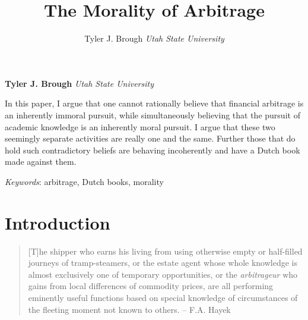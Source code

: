 \documentclass[11pt,]{article}
\title{The Morality of Arbitrage  }
\author{\Large Tyler J. Brough\vspace{0.05in} \newline\normalsize\emph{Utah State University}  }
\date{}
\newcommand*{\authorfont}{\fontfamily{phv}\selectfont}
\renewenvironment{abstract}
 {{%
    \setlength{\leftmargin}{0mm}
    \setlength{\rightmargin}{\leftmargin}%
  }%
  \relax}
 {\endlist}
\begin{document}
	
%

{%
\setlength{\parindent}{0pt}
\thispagestyle{plain}
{\fontsize{18}{20}\selectfont\raggedright 
\maketitle  %

}

{
   \vskip 13.5pt\relax \normalsize\fontsize{11}{12} 
\textbf{\authorfont Tyler J. Brough} \hskip 15pt \emph{\small Utah State University}   

}

}







\begin{abstract}

    \hbox{\vrule height .2pt width 39.14pc}

    \vskip 8.5pt %

\noindent In this paper, I argue that one cannot rationally believe that financial
arbitrage is an inherently immoral pursuit, while simultaneously
believing that the pursuit of academic knowledge is an inherently moral
pursuit. I argue that these two seemingly separate activities are really
one and the same. Further those that do hold such contradictory beliefs
are behaving incoherently and have a Dutch book made against them.


\vskip 8.5pt \noindent \emph{Keywords}: arbitrage, Dutch books, morality \par

    \hbox{\vrule height .2pt width 39.14pc}



\end{abstract}


\vskip 6.5pt

\noindent \doublespacing \section{Introduction}\label{introduction}

\begin{quote}
{[}T{]}he shipper who earns his living from using otherwise empty or
half-filled journeys of tramp-steamers, or the estate agent whose whole
knowledge is almost exclusively one of temporary opportunities, or the
\emph{arbitrageur} who gains from local differences of commodity prices,
are all performing eminently useful functions based on special knowledge
of circumstances of the fleeting moment not known to others. -- F.A.
Hayek
\end{quote}
\end{document}
